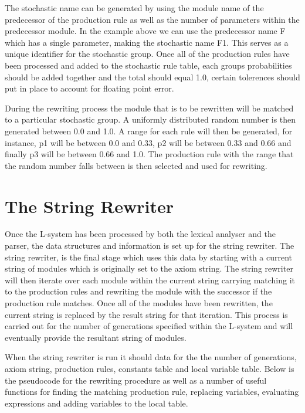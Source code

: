 The stochastic name can be generated by using the module name of the predecessor of the production rule as well as the number of parameters within the predecessor module. In the example above we can use the predecessor name F which has a single parameter, making the stochastic name F1. This serves as a unique identifier for the stochastic group. Once all of the production rules have been processed and added to the stochastic rule table, each groups probabilities should be added together and the total should equal 1.0, certain tolerences should put in place to account for floating point error. 

During the rewriting process the module that is to be rewritten will be matched to a particular stochastic group. A uniformly distributed random number is then generated between 0.0 and 1.0. A range for each rule will then be generated, for instance, p1 will be between 0.0 and 0.33, p2 will be between 0.33 and 0.66 and finally p3 will be between 0.66 and 1.0. The production rule with the range that the random number falls between is then selected and used for rewriting. 

\section{The String Rewriter}

Once the L-system has been processed by both the lexical analyser and the parser, the data structures and information is set up for the string rewriter. The string rewriter, is the final stage which uses this data by starting with a current string of modules which is originally set to the axiom string. The string rewriter will then iterate over each module within the current string carrying matching it to the production rules and rewriting the module with the successor if the production rule matches. Once all of the modules have been rewritten, the current string is replaced by the result string for that iteration. This process is carried out for the number of generations specified within the L-system and will eventually provide the resultant string of modules.

When the string rewriter is run it should data for the the number of generations, axiom string, production rules, constants table and local variable table. Below is the pseudocode for the rewriting procedure as well as a number of useful functions for finding the matching production rule, replacing variables, evaluating expressions and adding variables to the local table. 

